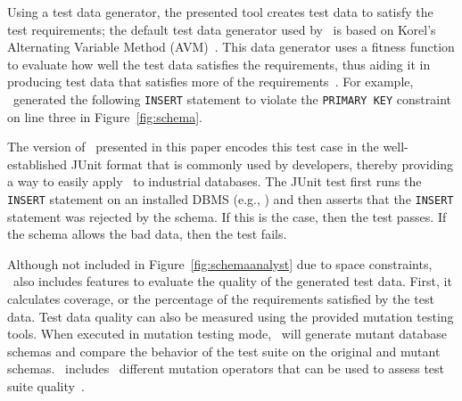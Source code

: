 Using a test data generator, the presented tool creates test data to satisfy the test requirements; the default test
data generator used by \sa~is based on Korel's Alternating Variable Method (AVM)~\cite{Korel:AVM}. This data generator
uses a fitness function to evaluate how well the test data satisfies the requirements, thus aiding it in producing test
data that satisfies more of the requirements~\cite{mcminn2015effectiveness}. For example, \sa~generated the following
\texttt{INSERT} statement to violate the \texttt{PRIMARY KEY} constraint on line three in Figure~\ref{fig:schema}.


\vspace{1ex}

\noindent {}

\vspace{1ex}


The version of \sa~presented in this paper encodes this test case in the well-established JUnit format that is commonly
used by developers, thereby providing a way to easily apply \sa~to industrial databases. The JUnit test first runs the
\texttt{INSERT} statement on an installed DBMS (e.g., \sqlite) and then asserts that the \texttt{INSERT} statement was
rejected by the schema. If this is the case, then the test passes. If the schema allows the bad data, then the test
fails.




Although not included in Figure~\ref{fig:schemaanalyst} due to space constraints, \sa~also includes features to evaluate
the quality of the generated test data. First, it calculates coverage, or the percentage of the requirements satisfied
by the test data. Test data quality can also be measured using the provided mutation testing tools. When executed in
mutation testing mode, \sa~will generate mutant database schemas and compare the behavior of the test suite on the
original and mutant schemas. \sa~includes \nummutationoperators~different mutation operators that can be used to assess
test suite quality~\cite{wright2015mutation}.



